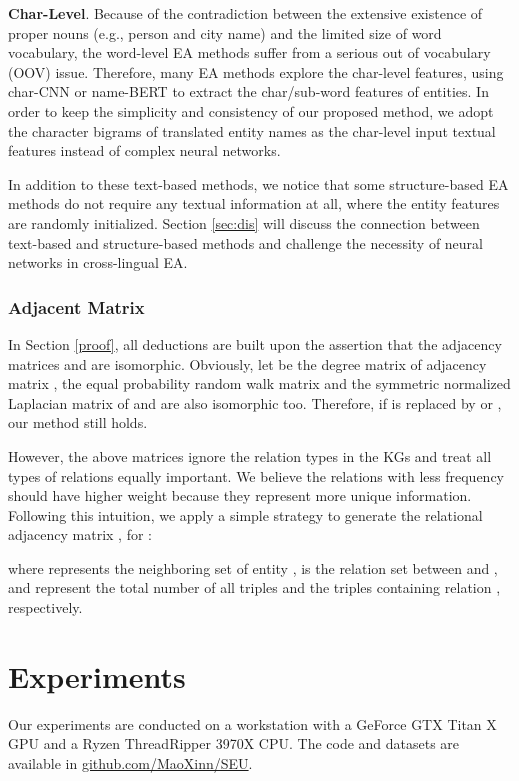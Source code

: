 \documentclass[11pt]{article}
\begin{document}
\textbf{Char-Level}.
Because of the contradiction between the extensive existence of proper nouns (e.g., person and city name) and the limited size of word vocabulary, the word-level EA methods suffer from a serious out of vocabulary (OOV) issue.
Therefore, many EA methods explore the char-level features, using char-CNN \cite{DBLP:conf/emnlp/WangYY20} or name-BERT \cite{DBLP:conf/emnlp/LiuCPLC20} to extract the char/sub-word features of entities.
In order to keep the simplicity and consistency of our proposed method, we adopt the character bigrams of translated entity names as the char-level input textual features instead of complex neural networks.

In addition to these text-based methods, we notice that some structure-based EA methods \cite{DBLP:conf/emnlp/WangLLZ18, DBLP:conf/icml/GuoSH19} do not require any textual information at all, where the entity features are randomly initialized.
Section \ref{sec:dis} will discuss the connection between text-based and structure-based methods and challenge the necessity of neural networks in cross-lingual EA.

\subsubsection{Adjacent Matrix }
\label{sec:adj}
In Section \ref{proof}, all deductions are built upon the assertion that the adjacency matrices  and  are isomorphic.
Obviously, let  be the degree matrix of adjacency matrix , the equal probability random walk matrix  and the symmetric normalized Laplacian matrix  of  and  are also isomorphic too.
Therefore, if  is replaced by  or , our method still holds.

However, the above matrices ignore the relation types in the KGs and treat all types of relations equally important.
We believe the relations with less frequency should have higher weight because they represent more unique information.
Following this intuition, we apply a simple strategy to generate the relational adjacency matrix , for :
\begin{small}

\end{small}
where  represents the neighboring set of entity ,  is the relation set between  and ,  and  represent the total number of all triples and the triples containing relation , respectively.

\section{Experiments}
Our experiments are conducted on a workstation with a GeForce GTX Titan X GPU and a Ryzen ThreadRipper 3970X CPU.
The code and datasets are available in \url{github.com/MaoXinn/SEU}.
\end{document}
